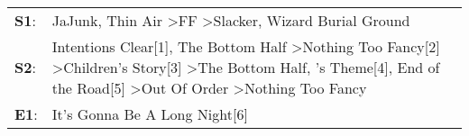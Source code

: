 \begin{supertabular}{p{0.03\textwidth}p{0.92\textwidth}}
 \textbf{S1}:  &                                                                                                                                                                                                                                                                   JaJunk\textsuperscript{}, \enspace Thin Air\textsuperscript{} \textgreater \enspace FF\textsuperscript{} \textgreater \enspace Slacker\textsuperscript{}, \enspace Wizard Burial Ground\textsuperscript{}  \enspace  \\
 \textbf{S2}:  &  Intentions Clear[1]\textsuperscript{}, \enspace The Bottom Half\textsuperscript{} \textgreater \enspace Nothing Too Fancy[2]\textsuperscript{} \textgreater \enspace Children's Story[3]\textsuperscript{} \textgreater \enspace The Bottom Half\textsuperscript{}, 's Theme[4]\textsuperscript{}, \enspace End of the Road[5]\textsuperscript{} \textgreater \enspace Out Of Order\textsuperscript{} \textgreater \enspace Nothing Too Fancy\textsuperscript{}  \enspace  \\
 \textbf{E1}:  &                                                                                                                                                                                                                                                                                                                                                                                                                             It's Gonna Be A Long Night[6]\textsuperscript{}  \enspace  \\
\end{supertabular}

